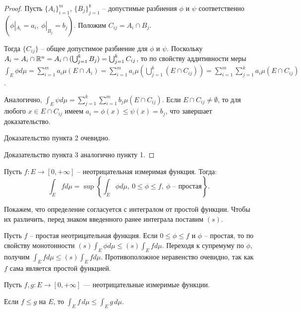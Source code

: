 \begin{proof}
    Пусть $\{A_{i}\}_{i = 1}^{m}$, $\{B_{j}\}_{j = 1}^{k}$ -- допустимые разбиения $\phi$ и $\psi$ соответственно $(\phi|_{A_{i}} = a_{i}, \ \phi|_{B_{j}} = b_{j})$. Положим $C_{ij} = A_{i} \cap B_{j}$.

    Тогда $\{C_{ij}\}$ -- общее допустимое разбиение для $\phi$ и $\psi$. Поскольку $A_{i} = A_{i} \cap \mathbb{R}^{n} = A_{i} \cap (\bigcup_{j = 1}^{k}B_{j}) = \bigcup_{j = 1}^{k}C_{ij}$, то по свойству аддитивности меры $\int_{E}\phi d\mu = \sum_{i = 1}^{m}a_{i} \mu(E \cap A_{i}) = \sum_{i = 1}^{m}a_{i}\mu(\bigcup_{j = 1}^{k}(E \cap C_{ij})) = \sum_{i = 1}^{m}\sum_{j = 1}^{k}a_{i}\mu(E \cap C_{ij})$.

    Аналогично, $\int_{E} \psi d\mu = \sum_{j = 1}^{k}\sum_{i = 1}^{m}b_{j}\mu(E \cap C_{ij})$. Если $E \cap C_{ij} \neq \emptyset$, то для любого $x \in E \cap C_{ij}$ имеем $a_{i} = \phi(x) \leq \psi(x) = b_{j}$, что завершает доказательство.

    Доказательство пункта 2 очевидно.

    Доказательство пункта 3 аналогично пункту 1.
\end{proof}

\begin{definition}
    Пусть $f: E \to [0, +\infty]$ -- неотрицательная измеримая функция. Тогда:
    \[\int_{E} f d\mu = \sup\left\{\int_{E}\phi d\mu, \ 0 \leq \phi \leq f, \ \phi \text{ -- простая}\right\}.\]
\end{definition}

\begin{note}
    Покажем, что определение согласуется с интегралом от простой функции. Чтобы их различить, перед знаком введенного ранее интеграла поставим $(s)$.

    Пусть $f$ -- простая неотрицательная функция. Если $0 \leq \phi \leq f$ и $\phi$ -- простая, то по свойству монотонности $(s)\int_{E} \phi d\mu \leq (s) \int_{E} f d\mu$. Переходя к супремуму по $\phi$, получим $\int_{E} f d\mu \leq (s) \int_{E} f d\mu$. Противоположное неравенство очевидно, так как $f$ сама является простой функцией.
\end{note}

Пусть $f, g : E \rightarrow [0, +\infty]$ --- неотрицательные измеримые функции.

\begin{property}[монотонность]
    \label{lebint-prop1}
    Если $f \le g$ на $E$, то $\int_E f \, d\mu \le \int_E g \, d\mu$.
\end{property}

